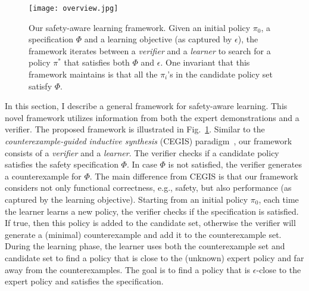\begin{figure}
\centering
  \texttt{[image: overview.jpg]}
\caption[Counterexample-Guided Apprenticeship Learning]{
Our safety-aware learning framework. Given an initial policy $\pi_0$, a specification $\Phi$ and a learning objective (as captured by $\epsilon$), the framework iterates between a {\it verifier} and a {\it learner} to search for a policy $\pi^*$ that satisfies both $\Phi$ and $\epsilon$. One invariant that this framework maintains is that all the $\pi_i$'s in the candidate policy set satisfy $\Phi$.}
\label{fig:sec4_1}
\end{figure}
In this section, I describe a general framework for safety-aware learning. 
This novel framework utilizes information from both the expert demonstrations and a verifier. 
The proposed framework is illustrated in Fig.~\ref{fig:sec4_1}. Similar to the \emph{counterexample-guided inductive synthesis} (CEGIS) paradigm~\cite{CEGIS}, our framework consists of a {\it verifier} and a {\it learner}. The verifier checks if a candidate policy satisfies the safety specification $\Phi$. In case $\Phi$ is not satisfied, the verifier generates a counterexample for $\Phi$. 
The main difference from CEGIS is that our framework considers not only functional correctness, e.g., safety, but also performance (as captured by the learning objective). Starting from an initial policy $\pi_0$, each time the learner learns a new policy, the verifier checks if the specification is satisfied. If true, then this policy is added to the candidate set, otherwise the verifier will generate a (minimal) counterexample and add it to the counterexample set. During the learning phase, the learner uses both the counterexample set and candidate set to find a policy that is close to the (unknown) expert policy and far away from the counterexamples. The goal is to find a policy that is $\epsilon$-close to the expert policy and satisfies the specification. 

